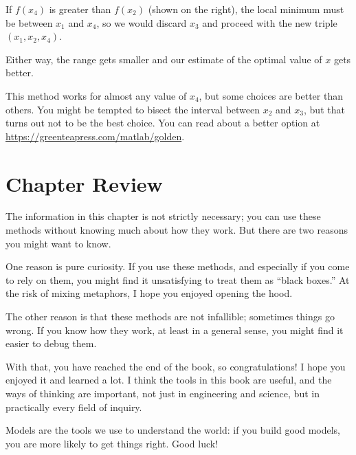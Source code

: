 If $f(x_4)$ is greater than $f(x_2)$ (shown on the right), the
local minimum must be between $x_1$ and $x_4$, so we would discard $x_3$ and proceed with the new triple $(x_1, x_2, x_4)$.

Either way, the range gets smaller and our estimate of the optimal value of $x$ gets better.

This method works for almost any value of $x_4$, but some choices
are better than others.  You might be tempted to bisect the interval between $x_2$ and $x_3$, but that turns out not to be the best choice.  You can read about a better option at \url{https://greenteapress.com/matlab/golden}.

\section{Chapter Review}

The information in this chapter is not strictly necessary; you can use these methods without knowing much about how they work.  But there are two reasons you might want to know.

One reason is pure curiosity.  If you use these methods, and especially if you come to rely on them, you might find it unsatisfying to treat them as ``black boxes.''  At the risk of mixing metaphors, I hope you enjoyed opening the hood.

The other reason is that these methods are not infallible; sometimes things go wrong.  If you know how they work, at least in a general sense, you might find it easier to debug them.

With that, you have reached the end of the book, so congratulations!  I hope you enjoyed it and learned a lot.  I think the tools in this book are useful, and the ways of thinking are important, not just in engineering and science, but in practically every field of inquiry.

Models are the tools we use to understand the world: if you build good models, you are more likely to get things right.  Good luck!
